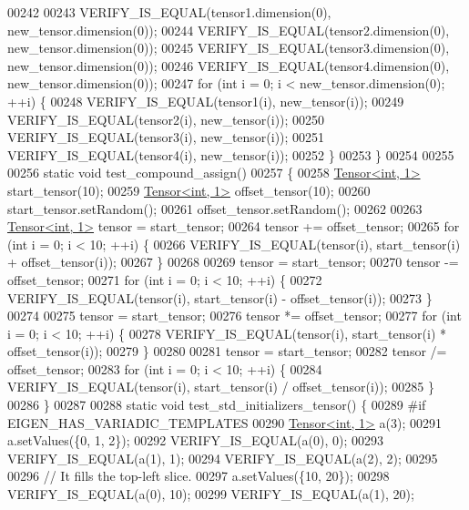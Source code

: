 \begin{DoxyCode}
00242 
00243   VERIFY\_IS\_EQUAL(tensor1.dimension(0), new\_tensor.dimension(0));
00244   VERIFY\_IS\_EQUAL(tensor2.dimension(0), new\_tensor.dimension(0));
00245   VERIFY\_IS\_EQUAL(tensor3.dimension(0), new\_tensor.dimension(0));
00246   VERIFY\_IS\_EQUAL(tensor4.dimension(0), new\_tensor.dimension(0));
00247   \textcolor{keywordflow}{for} (\textcolor{keywordtype}{int} i = 0; i < new\_tensor.dimension(0); ++i) \{
00248     VERIFY\_IS\_EQUAL(tensor1(i), new\_tensor(i));
00249     VERIFY\_IS\_EQUAL(tensor2(i), new\_tensor(i));
00250     VERIFY\_IS\_EQUAL(tensor3(i), new\_tensor(i));
00251     VERIFY\_IS\_EQUAL(tensor4(i), new\_tensor(i));
00252   \}
00253 \}
00254 
00255 
00256 \textcolor{keyword}{static} \textcolor{keywordtype}{void} test\_compound\_assign()
00257 \{
00258   \hyperlink{class_eigen_1_1_tensor}{Tensor<int, 1>} start\_tensor(10);
00259   \hyperlink{class_eigen_1_1_tensor}{Tensor<int, 1>} offset\_tensor(10);
00260   start\_tensor.setRandom();
00261   offset\_tensor.setRandom();
00262 
00263   \hyperlink{class_eigen_1_1_tensor}{Tensor<int, 1>} tensor = start\_tensor;
00264   tensor += offset\_tensor;
00265   \textcolor{keywordflow}{for} (\textcolor{keywordtype}{int} i = 0; i < 10; ++i) \{
00266     VERIFY\_IS\_EQUAL(tensor(i), start\_tensor(i) + offset\_tensor(i));
00267   \}
00268 
00269   tensor = start\_tensor;
00270   tensor -= offset\_tensor;
00271   \textcolor{keywordflow}{for} (\textcolor{keywordtype}{int} i = 0; i < 10; ++i) \{
00272     VERIFY\_IS\_EQUAL(tensor(i), start\_tensor(i) - offset\_tensor(i));
00273   \}
00274 
00275   tensor = start\_tensor;
00276   tensor *= offset\_tensor;
00277   \textcolor{keywordflow}{for} (\textcolor{keywordtype}{int} i = 0; i < 10; ++i) \{
00278     VERIFY\_IS\_EQUAL(tensor(i), start\_tensor(i) * offset\_tensor(i));
00279   \}
00280 
00281   tensor = start\_tensor;
00282   tensor /= offset\_tensor;
00283   \textcolor{keywordflow}{for} (\textcolor{keywordtype}{int} i = 0; i < 10; ++i) \{
00284     VERIFY\_IS\_EQUAL(tensor(i), start\_tensor(i) / offset\_tensor(i));
00285   \}
00286 \}
00287 
00288 \textcolor{keyword}{static} \textcolor{keywordtype}{void} test\_std\_initializers\_tensor() \{
00289 \textcolor{preprocessor}{#if EIGEN\_HAS\_VARIADIC\_TEMPLATES}
00290   \hyperlink{class_eigen_1_1_tensor}{Tensor<int, 1>} a(3);
00291   a.setValues(\{0, 1, 2\});
00292   VERIFY\_IS\_EQUAL(a(0), 0);
00293   VERIFY\_IS\_EQUAL(a(1), 1);
00294   VERIFY\_IS\_EQUAL(a(2), 2);
00295 
00296   \textcolor{comment}{// It fills the top-left slice.}
00297   a.setValues(\{10, 20\});
00298   VERIFY\_IS\_EQUAL(a(0), 10);
00299   VERIFY\_IS\_EQUAL(a(1), 20);

\end{DoxyCode}
